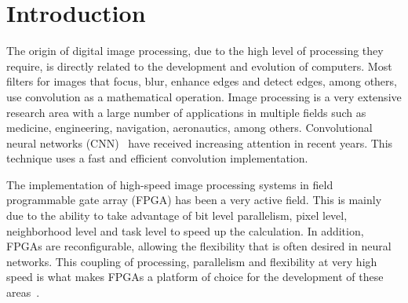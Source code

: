 \documentclass[conference,compsoc]{IEEEtran}
\begin{document}
\section{Introduction}





The origin of digital image processing, due to the high level of processing they
require, is directly related to the development and evolution of computers. Most
filters for images that focus, blur, enhance edges and detect edges, among
others, use convolution as a mathematical operation. Image processing is a very
extensive research area with a large number of applications in multiple fields
such as medicine, engineering, navigation, aeronautics, among others.
Convolutional neural networks (CNN)~\cite{Lecun-et-al-1998} have received
increasing attention in recent years. This technique uses a fast and efficient
convolution implementation.

The implementation of high-speed image processing systems in field programmable
gate array (FPGA) has been a very active field. This is mainly due to the
ability to take advantage of bit level parallelism, pixel level, neighborhood
level and task level to speed up the calculation. In addition, FPGAs are
reconfigurable, allowing the flexibility that is often desired in neural
networks. This coupling of processing, parallelism and flexibility at very high
speed is what makes FPGAs a platform of choice for the development of these
areas~\cite{papercnn}.
\end{document}
